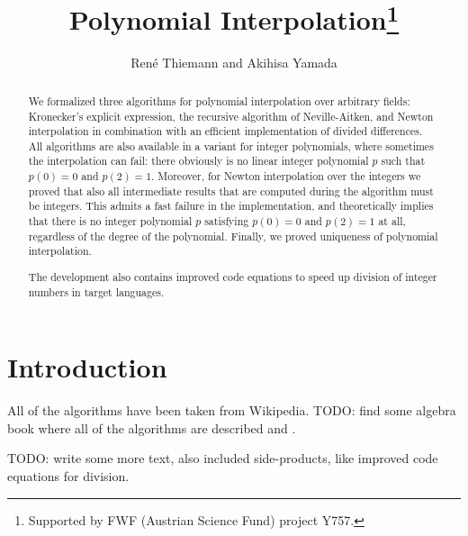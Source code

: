 \documentclass[11pt,a4paper]{article}
\begin{document}
\title{Polynomial Interpolation\footnote{Supported by FWF (Austrian Science Fund) project Y757.}}
\author{Ren\'e Thiemann and Akihisa Yamada}
\maketitle

\begin{abstract}
We formalized three algorithms for polynomial interpolation over arbitrary fields: 
Kronecker's explicit expression,
the recursive algorithm of Neville-Aitken, and Newton interpolation in combination with an
efficient implementation of divided differences. All algorithms are also available in a variant
for integer polynomials, where sometimes the interpolation can fail: there obviously is no
linear integer polynomial $p$ such that $p(0) = 0$ and $p(2) = 1$. Moreover, for
Newton interpolation over the integers we proved that also all intermediate 
results that are computed during the algorithm must be integers. This admits a fast failure in the 
implementation, and theoretically implies that
there is no integer polynomial $p$ satisfying $p(0) = 0$ and $p(2) = 1$ at all, regardless
of the degree of the polynomial.
Finally, we proved uniqueness of polynomial interpolation.

The development also contains improved code equations to speed up division of integer numbers
in target languages.
\end{abstract}

\tableofcontents

\section{Introduction}

All of the algorithms have been taken from Wikipedia.
TODO: find some algebra book where all of the algorithms are described and \cite{it}.

TODO: write some more text, also included side-products, like improved code equations for
division.









\end{document}
